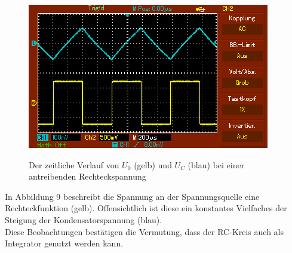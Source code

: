 	 \begin{figure}[H]
	 	\centering
	 	\caption{Der zeitliche Verlauf von $U_0$ (gelb) und $U_C$ (blau) bei einer antreibenden Rechteckspannung}
	 	\includegraphics[width=\linewidth-70pt,height=\textheight-70pt,keepaspectratio]{content/MAP004.png}
	 	\label{fig:Rechteck}
	 \end{figure}
	 In Abbildung 9 beschreibt die Spannung an der Spannungsquelle eine Rechteckfunktion (gelb). Offensichtlich ist diese ein konstantes Vielfaches der Steigung der Kondensatorspannung (blau).\\

	 Diese Beobachtungen bestätigen die Vermutung, dass der RC-Kreis auch als Integrator genutzt werden kann.
